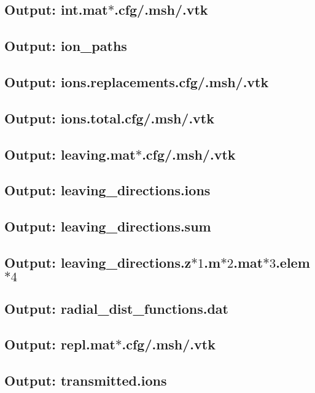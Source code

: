 \subsection{Output: int.mat$*$.cfg/.msh/.vtk}

\subsection{Output: ion\_paths}

\subsection{Output: ions.replacements.cfg/.msh/.vtk}

\subsection{Output: ions.total.cfg/.msh/.vtk}

\subsection{Output: leaving.mat$*$.cfg/.msh/.vtk}

\subsection{Output: leaving\_directions.ions}

\subsection{Output: leaving\_directions.sum}

\subsection{Output: leaving\_directions.z$*1$.m$*2$.mat$*3$.elem$*4$}

\subsection{Output: radial\_dist\_functions.dat}

\subsection{Output: repl.mat$*$.cfg/.msh/.vtk}

\subsection{Output: transmitted.ions}

